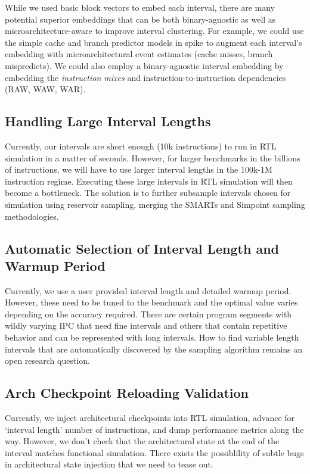\documentclass[sigplan,nonacm,10pt]{acmart}
\begin{document}
While we used basic block vectors to embed each interval, there are many potential superior embeddings that can be both binary-agnostic as well as microarchitecture-aware to improve interval clustering.
For example, we could use the simple cache and branch predictor models in spike to augment each interval's embedding with microarchitectural event estimates (cache misses, branch mispredicts).
We could also employ a binary-agnostic interval embedding by embedding the \textit{instruction mixes} and instruction-to-instruction dependencies (RAW, WAW, WAR).

\subsection{Handling Large Interval Lengths}

Currently, our intervals are short enough (10k instructions) to run in RTL simulation in a matter of seconds.
However, for larger benchmarks in the billions of instructions, we will have to use larger interval lengths in the 100k-1M instruction regime.
Executing these large intervals in RTL simulation will then become a bottleneck.
The solution is to further subsample intervals chosen for simulation using reservoir sampling, merging the SMARTs and Simpoint sampling methodologies.

\subsection{Automatic Selection of Interval Length and Warmup Period}

Currently, we use a user provided interval length and detailed warmup period.
However, these need to be tuned to the benchmark and the optimal value varies depending on the accuracy required.
There are certain program segments with wildly varying IPC that need fine intervals and others that contain repetitive behavior and can be represented with long intervals.
How to find variable length intervals that are automatically discovered by the sampling algorithm remains an open research question.

\subsection{Arch Checkpoint Reloading Validation}

Currently, we inject architectural checkpoints into RTL simulation, advance for `interval length' number of instructions, and dump performance metrics along the way.
However, we don't check that the architectural state at the end of the interval matches functional simulation.
There exists the possiblility of subtle bugs in architectural state injection that we need to tease out.
\end{document}

